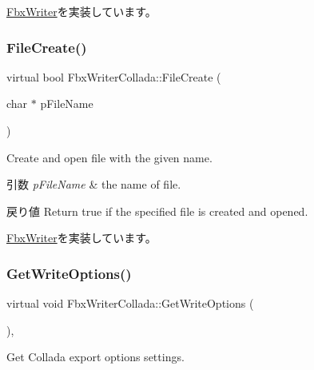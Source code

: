\hyperlink{class_fbx_writer_a0387142f55d0020fd5360759c12aa121}{Fbx\+Writer}を実装しています。

\mbox{\label{class_fbx_writer_collada_a973e285681d8486e74a200812eeee70a}} 
\subsubsection{\texorpdfstring{File\+Create()}{FileCreate()}}
{\footnotesize\ttfamily virtual bool Fbx\+Writer\+Collada\+::\+File\+Create (\begin{DoxyParamCaption}\item[{char $\ast$}]{p\+File\+Name }\end{DoxyParamCaption})\hspace{0.3cm}{\ttfamily [virtual]}}

Create and open file with the given name. 
\begin{DoxyParams}{引数}
{\em p\+File\+Name} & the name of file. \\
\hline
\end{DoxyParams}
\begin{DoxyReturn}{戻り値}
Return true if the specified file is created and opened. 
\end{DoxyReturn}


\hyperlink{class_fbx_writer_abe6729227cd6e3be5ee3ab0c1b8b0eda}{Fbx\+Writer}を実装しています。

\mbox{\label{class_fbx_writer_collada_a64fdc18e00335c37acf279a5ef0d3711}} 
\subsubsection{\texorpdfstring{Get\+Write\+Options()}{GetWriteOptions()}}
{\footnotesize\ttfamily virtual void Fbx\+Writer\+Collada\+::\+Get\+Write\+Options (\begin{DoxyParamCaption}{ }\end{DoxyParamCaption})\hspace{0.3cm}{\ttfamily [inline]}, {\ttfamily [virtual]}}

Get Collada export options settings. 

